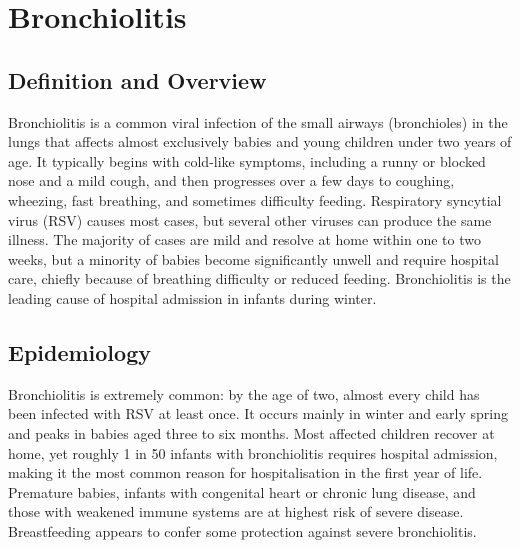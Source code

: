 \chapter{Bronchiolitis}

\section*{Definition and Overview}
Bronchiolitis is a common viral infection of the small airways (bronchioles) in the lungs that affects almost exclusively babies and young children under two years of age. It typically begins with cold-like symptoms, including a runny or blocked nose and a mild cough, and then progresses over a few days to coughing, wheezing, fast breathing, and sometimes difficulty feeding. Respiratory syncytial virus (RSV) causes most cases, but several other viruses can produce the same illness. The majority of cases are mild and resolve at home within one to two weeks, but a minority of babies become significantly unwell and require hospital care, chiefly because of breathing difficulty or reduced feeding. Bronchiolitis is the leading cause of hospital admission in infants during winter.

\section*{Epidemiology}
Bronchiolitis is extremely common: by the age of two, almost every child has been infected with RSV at least once. It occurs mainly in winter and early spring and peaks in babies aged three to six months. Most affected children recover at home, yet roughly 1 in 50 infants with bronchiolitis requires hospital admission, making it the most common reason for hospitalisation in the first year of life. Premature babies, infants with congenital heart or chronic lung disease, and those with weakened immune systems are at highest risk of severe disease. Breastfeeding appears to confer some protection against severe bronchiolitis.

